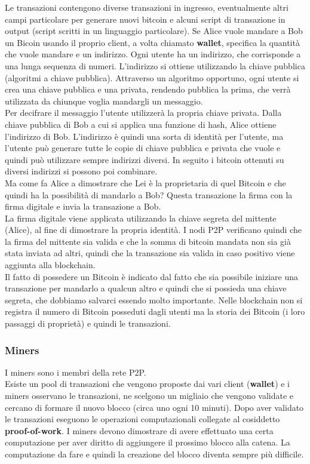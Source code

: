 Le transazioni contengono diverse transazioni in ingresso, eventualmente altri campi particolare per generare nuovi bitcoin e alcuni script di transazione in output (script scritti in un linguaggio particolare). Se Alice vuole mandare a Bob un Bicoin usando il proprio client, a volta chiamato \textbf{wallet}, specifica la quantità che vuole mandare e un indirizzo. Ogni utente ha un indirizzo, che corrisponde a una lunga sequenza di numeri.  L’indirizzo si ottiene utilizzando la chiave pubblica (algoritmi a chiave pubblica). Attraverso un algoritmo opportuno, ogni utente si crea una chiave pubblica e una privata, rendendo pubblica la prima, che verrà utilizzata da chiunque voglia mandargli un messaggio.  \\
Per decifrare il messaggio l’utente utilizzerà la propria chiave privata. Dalla chiave pubblica di Bob a cui si applica una funzione di hash, Alice ottiene l’indirizzo di Bob. L’indirizzo è quindi una sorta di identità per l’utente, ma l’utente può generare tutte le copie di chiave pubblica e privata che vuole e quindi può utilizzare sempre indirizzi diversi. In seguito i bitcoin ottenuti su diversi indirizzi si possono poi combinare. \\ Ma come fa Alice a dimostrare che Lei è la proprietaria di quel Bitcoin e che quindi ha la possibilità di mandarlo a Bob? Questa transazione la firma con la firma digitale e invia la transazione a Bob. \\
La firma digitale viene applicata utilizzando la chiave segreta del mittente (Alice), al fine di dimostrare la propria identità.
I nodi P2P verificano quindi che la firma del mittente sia valida e che la somma di bitcoin mandata non sia già stata inviata ad altri, quindi che la transazione sia valida in caso positivo viene aggiunta alla blockchain. \\
Il fatto di possedere un Bitcoin è indicato dal fatto che sia possibile iniziare una transazione per mandarlo a qualcun altro e quindi che si possieda una chiave segreta, che dobbiamo salvarci essendo molto importante. 
Nelle blockchain non si registra il numero di Bitcoin posseduti dagli utenti ma la storia dei Bitcoin (i loro passaggi di proprietà) e quindi le transazioni.

\subsubsection{Miners}
I miners sono  i membri della rete P2P. \\
Esiste un pool di transazioni che vengono proposte dai vari client (\textbf{wallet}) e i miners osservano le transazioni, ne scelgono un migliaio che vengono validate e cercano di formare il nuovo blocco (circa uno ogni 10 minuti). Dopo aver validato le transazioni eseguono le operazioni computazionali collegate al cosiddetto \textbf{proof-of-work}. I miners devono dimostrare di avere effettuato una certa computazione per aver diritto di aggiungere il prossimo blocco alla catena. La computazione da fare e quindi la creazione del blocco diventa sempre più difficile. \\

